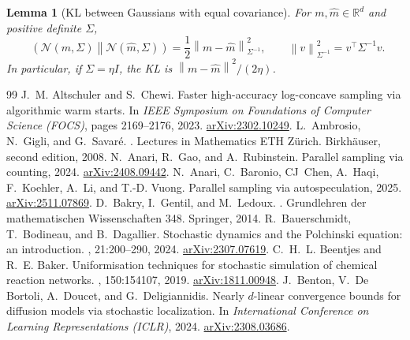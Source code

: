 \documentclass[10pt,a4paper]{amsart}
\numberwithin{equation}{section}
\newtheorem{lemma}[theorem]{Lemma}
\DeclareMathOperator{\KL}{D_{\mathsf{KL}}}
\newcommand{\R}{\mathbb{R}}
\newcommand{\Id}{I}
\newcommand{\wh}[1]{\widehat{#1}}
\newcommand{\norm}[1]{\left\lVert #1 \right\rVert}
\newcommand{\normal}[2]{\mathcal{N}\!\left(#1,#2\right)}
\begin{document}
\begin{lemma}[KL between Gaussians with equal covariance]\label{lem:gaussian-kl}
For $m,\wh m\in\R^d$ and positive definite $\Sigma$,
\[
    \KL\!\left(\normal{m}{\Sigma}\middle\|\normal{\wh m}{\Sigma}\right)
    =
    \frac12\norm{m-\wh m}_{\Sigma^{-1}}^2,
    \qquad
    \norm v_{\Sigma^{-1}}^2=v^\top\Sigma^{-1}v.
\]
In particular, if $\Sigma=\eta\Id$, the KL is
$\norm{m-\wh m}^2/(2\eta)$.
\end{lemma}


\begin{thebibliography}{99}
 J.~M. Altschuler and S.~Chewi. \newblock Faster high-accuracy log-concave sampling via algorithmic warm starts. \newblock In {\em IEEE Symposium on Foundations of Computer Science (FOCS)}, pages 2169--2176, 2023. \newblock \href{https://arxiv.org/abs/2302.10249}{arXiv:2302.10249}.
 L.~Ambrosio, N.~Gigli, and G.~Savar{\'e}. . \newblock Lectures in Mathematics ETH Z{\"u}rich. Birkh{\"a}user, second edition, 2008.
 N.~Anari, R.~Gao, and A.~Rubinstein. \newblock Parallel sampling via counting, 2024. \newblock \href{https://arxiv.org/abs/2408.09442}{arXiv:2408.09442}.
 N.~Anari, C.~Baronio, CJ~Chen, A.~Haqi, F.~Koehler, A.~Li, and T.-D. Vuong. \newblock Parallel sampling via autospeculation, 2025. \newblock \href{https://arxiv.org/abs/2511.07869}{arXiv:2511.07869}.
 D.~Bakry, I.~Gentil, and M.~Ledoux. . \newblock Grundlehren der mathematischen Wissenschaften 348. Springer, 2014.
 R.~Bauerschmidt, T.~Bodineau, and B.~Dagallier. \newblock Stochastic dynamics and the {Polchinski} equation: an introduction. , 21:200--290, 2024. \newblock \href{https://arxiv.org/abs/2307.07619}{arXiv:2307.07619}.
 C.~H.~L. Beentjes and R.~E. Baker. \newblock Uniformisation techniques for stochastic simulation of chemical reaction networks. , 150:154107, 2019. \newblock \href{https://arxiv.org/abs/1811.00948}{arXiv:1811.00948}.
 J.~Benton, V.~De Bortoli, A.~Doucet, and G.~Deligiannidis. \newblock Nearly $d$-linear convergence bounds for diffusion models via stochastic localization. \newblock In {\em International Conference on Learning Representations (ICLR)}, 2024. \newblock \href{https://arxiv.org/abs/2308.03686}{arXiv:2308.03686}.

\end{thebibliography}
\end{document}
